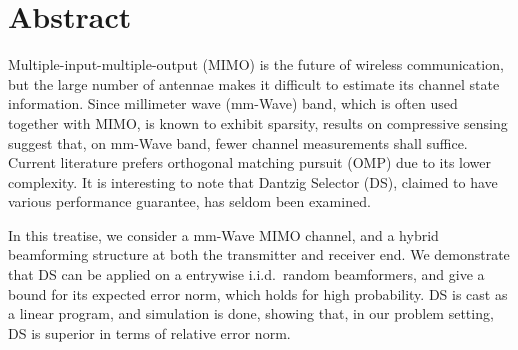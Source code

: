 
\chapter* {Abstract}

Multiple-input-multiple-output (MIMO) is the future of wireless communication, but the large number of antennae makes it difficult to estimate its channel state information.
Since millimeter wave (mm-Wave) band, which is often used together with MIMO, is known to exhibit sparsity, results on compressive sensing suggest that, on mm-Wave band, fewer channel measurements shall suffice.
Current literature prefers orthogonal matching pursuit (OMP) due to its lower complexity.
It is interesting to note that Dantzig Selector (DS), claimed to have various performance guarantee, has seldom been examined.

In this treatise, we consider a mm-Wave MIMO channel, and a hybrid beamforming structure at both the transmitter and receiver end.
We demonstrate that DS can be applied on a entrywise i.i.d.\ random beamformers, and give a bound for its expected error norm, which holds for high probability.
DS is cast as a linear program, and simulation is done, showing that, in our problem setting, DS is superior in terms of relative error norm.


